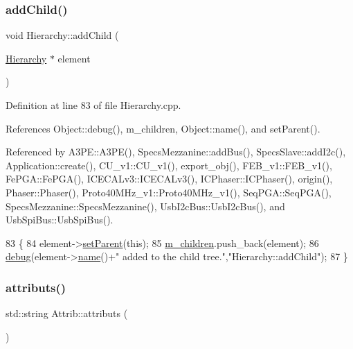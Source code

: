 \subsubsection{\texorpdfstring{add\+Child()}{addChild()}}
{\footnotesize\ttfamily void Hierarchy\+::add\+Child (\begin{DoxyParamCaption}\item[{\hyperlink{classHierarchy}{Hierarchy} $\ast$}]{element }\end{DoxyParamCaption})\hspace{0.3cm}{\ttfamily [virtual]}}



Definition at line 83 of file Hierarchy.\+cpp.



References Object\+::debug(), m\+\_\+children, Object\+::name(), and set\+Parent().



Referenced by A3\+P\+E\+::\+A3\+P\+E(), Specs\+Mezzanine\+::add\+Bus(), Specs\+Slave\+::add\+I2c(), Application\+::create(), C\+U\+\_\+v1\+::\+C\+U\+\_\+v1(), export\+\_\+obj(), F\+E\+B\+\_\+v1\+::\+F\+E\+B\+\_\+v1(), Fe\+P\+G\+A\+::\+Fe\+P\+G\+A(), I\+C\+E\+C\+A\+Lv3\+::\+I\+C\+E\+C\+A\+Lv3(), I\+C\+Phaser\+::\+I\+C\+Phaser(), origin(), Phaser\+::\+Phaser(), Proto40\+M\+Hz\+\_\+v1\+::\+Proto40\+M\+Hz\+\_\+v1(), Seq\+P\+G\+A\+::\+Seq\+P\+G\+A(), Specs\+Mezzanine\+::\+Specs\+Mezzanine(), Usb\+I2c\+Bus\+::\+Usb\+I2c\+Bus(), and Usb\+Spi\+Bus\+::\+Usb\+Spi\+Bus().


\begin{DoxyCode}
83                                           \{
84   element->\hyperlink{classHierarchy_a585ad1aeec16077a0e532ab8b4fc557b}{setParent}(\textcolor{keyword}{this});
85   \hyperlink{classHierarchy_a038816763941fd4a930504917f60483b}{m\_children}.push\_back(element);
86   \hyperlink{classObject_aac010553f022165573714b7014a15f0d}{debug}(element->\hyperlink{classObject_a300f4c05dd468c7bb8b3c968868443c1}{name}()+\textcolor{stringliteral}{" added to the child tree."},\textcolor{stringliteral}{"Hierarchy::addChild"});
87 \}
\end{DoxyCode}
\mbox{\label{classAttrib_aee7bbf16b144887f196e1341b24f8a26}} 
\subsubsection{\texorpdfstring{attributs()}{attributs()}}
{\footnotesize\ttfamily std\+::string Attrib\+::attributs (\begin{DoxyParamCaption}{ }\end{DoxyParamCaption})\hspace{0.3cm}{\ttfamily [inherited]}}

